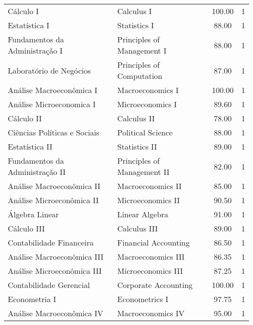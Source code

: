 \begin{center}

\tabletail{%
}
\tablelasttail{}	

 \begin{supertabular}{p{4.5cm} p{4.5cm} c c}
Cálculo I & Calculus I & 100.00 & 1 \\
Estatística I & Statistics I & 88.00 & 1 \\
Fundamentos da Administração I & Principles of Management I & 88.00 & 1 \\
Laboratório de Negócios & Principles of Computation & 87.00 & 1 \\
Análise Macroeconômica I & Macroeconomics I & 100.00 & 1 \\ 
Análise Microeconomica I & Microeconomics I & 89.60 & 1 \\
Cálculo II & Calculus II & 78.00 & 1 \\
Ciências Políticas e Sociais & Political Science & 88.00 & 1 \\
Estatística II & Statistics II & 89.00 & 1 \\
Fundamentos da Administração II & Principles of Management II & 82.00 & 1 \\
Análise Macroeconômica II & Macroeconomics II & 85.00 & 1 \\
Análise Microeconômica II & Microeconomics II & 90.50 & 1 \\
Álgebra Linear & Linear Algebra & 91.00 &1 \\
Cálculo III & Calculus III & 89.00 & 1 \\
Contabilidade Financeira & Financial Accounting & 86.50 & 1 \\
Análise Macroeconômica III & Macroeconomics III & 86.35 & 1 \\
Análise Microeconômica III & Microeconomics III & 87.25 & 1 \\
Contabilidade Gerencial & Corporate Accounting & 100.00 & 1 \\
Econometria I & Econometrics I &  97.75 & 1 \\
Análise Macroeconômica IV & Macroeconomics IV & 95.00 & 1 \\

\end{supertabular}
\end{center}
